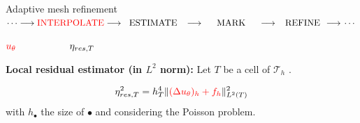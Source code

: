 \begin{frame}[noframenumbering]{Adaptive mesh refinement}
    \vspace{-10pt}
    $\cdots\longrightarrow
    \textcolor{red}{\text{INTERPOLATE}}\longrightarrow\hspace{6pt}
    \text{ESTIMATE}\hspace{8pt}\longrightarrow\hspace{14pt}
    \text{MARK}\hspace{14pt}\longrightarrow\hspace{8pt}
    \text{REFINE}\hspace{4pt}\longrightarrow\hspace{1pt}
    \cdots$

    \hspace{55pt}$\textcolor{red}{u_\theta}\hspace{55pt}\eta_{res,T}$

    \vspace{8pt}
    \textbf{Local residual estimator (in $L^2$ norm):} Let $T$ be a cell of $\mathcal{T}_h$ .

    \vspace{-8pt}
    $$\eta_{res,T}^2 = h_T^4 \|\textcolor{red}{(\Delta u_\theta)_h + f_h}\|_{L^2(T)}^2$$
    with $h_\bullet$ the size of $\bullet$ and considering the Poisson problem.
\end{frame}

